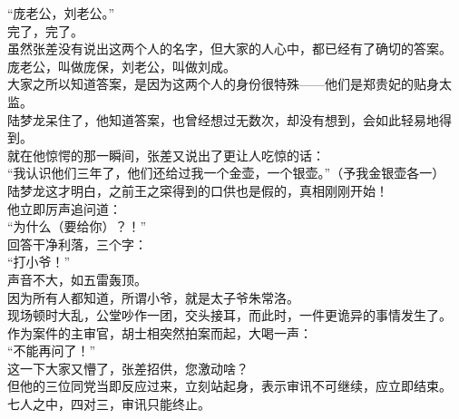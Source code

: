 \begin{multicols}{\theparacolNo}
“庞老公，刘老公。”\\

完了，完了。\\

虽然张差没有说出这两个人的名字，但大家的人心中，都已经有了确切的答案。\\

庞老公，叫做庞保，刘老公，叫做刘成。\\

大家之所以知道答案，是因为这两个人的身份很特殊——他们是郑贵妃的贴身太监。\\

陆梦龙呆住了，他知道答案，也曾经想过无数次，却没有想到，会如此轻易地得到。\\

就在他惊愕的那一瞬间，张差又说出了更让人吃惊的话：\\

“我认识他们三年了，他们还给过我一个金壶，一个银壶。”（予我金银壶各一）\\

陆梦龙这才明白，之前王之寀得到的口供也是假的，真相刚刚开始！\\

他立即厉声追问道：\\

“为什么（要给你）？！”\\

回答干净利落，三个字：\\

“打小爷！”\\

声音不大，如五雷轰顶。\\

因为所有人都知道，所谓小爷，就是太子爷朱常洛。\\

现场顿时大乱，公堂吵作一团，交头接耳，而此时，一件更诡异的事情发生了。\\

作为案件的主审官，胡士相突然拍案而起，大喝一声：\\

“不能再问了！”\\

这一下大家又懵了，张差招供，您激动啥？\\

但他的三位同党当即反应过来，立刻站起身，表示审讯不可继续，应立即结束。\\

七人之中，四对三，审讯只能终止。\\


\end{multicols}
